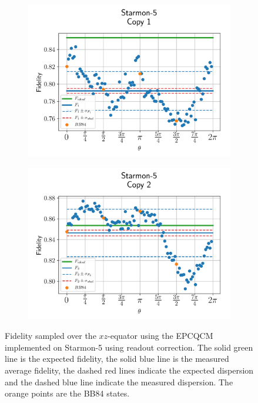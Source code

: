 \begin{figure}[H]
  \centering
  \begin{subfigure}{.5\textwidth}
    \centering
    \includegraphics[width=\textwidth]{Figures/Economical/Starmon/OnlyEquator/results_starmon_corrected_copy1.png}
    \label{fig:epc_corrected_starmon_equator_1}
  \end{subfigure}%
  \begin{subfigure}{.5\textwidth}
    \centering
    \includegraphics[width=\textwidth]{Figures/Economical/Starmon/OnlyEquator/results_starmon_corrected_copy2.png}
    \label{fig:epc_corrected_starmon_equator_2}
  \end{subfigure}
  \vspace{-0.5cm}
  \caption{Fidelity sampled over the $xz$-equator using the EPCQCM implemented on Starmon-5 using readout correction.
  The solid green line is the expected fidelity, the solid blue line is the measured average fidelity, the dashed red lines indicate the expected dispersion and the dashed blue line indicate the measured dispersion. The orange points are the BB84 states.}
  \label{fig:epc_corrected_starmon_equator}
\end{figure}

